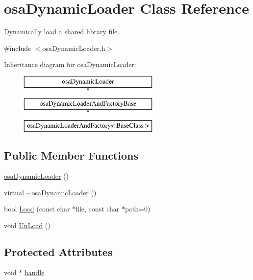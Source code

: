 \hypertarget{classosa_dynamic_loader}{\section{osa\-Dynamic\-Loader Class Reference}
\label{classosa_dynamic_loader}
}


Dynamically load a shared library file.  




{\ttfamily \#include $<$osa\-Dynamic\-Loader.\-h$>$}

Inheritance diagram for osa\-Dynamic\-Loader\-:\begin{figure}[H]
\begin{center}
\leavevmode
\includegraphics[height=3.000000cm]{d0/d64/classosa_dynamic_loader}
\end{center}
\end{figure}
\subsection*{Public Member Functions}
\begin{DoxyCompactItemize}
\item 
\hyperlink{classosa_dynamic_loader_aa4236a44f81ed4c9c6574de805819f39}{osa\-Dynamic\-Loader} ()
\item 
virtual \hyperlink{classosa_dynamic_loader_ac65cff54806c2d304f018cb04938298c}{$\sim$osa\-Dynamic\-Loader} ()
\item 
bool \hyperlink{classosa_dynamic_loader_a1a09c14de452798d15c2a7647c604fa7}{Load} (const char $\ast$file, const char $\ast$path=0)
\item 
void \hyperlink{classosa_dynamic_loader_ae1bc384582b840846f81768a7c1adbed}{Un\-Load} ()
\end{DoxyCompactItemize}
\subsection*{Protected Attributes}
\begin{DoxyCompactItemize}
\item 
void $\ast$ \hyperlink{classosa_dynamic_loader_aeee1ea1770407bfd73e49f3fb822d7ac}{handle}
\end{DoxyCompactItemize}


